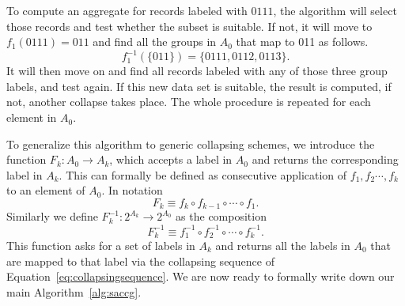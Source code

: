 \documentclass[11pt, fleqn]{article}
\begin{document}
To compute an aggregate for records labeled with $0111$, the algorithm will
select those records and test whether the subset is suitable. If not, it will
move to $f_1(0111)=011$ and find all the groups in $A_0$ that map to 011 as
follows.
\begin{displaymath}
f_1^{-1}(\{011\}) = \{0111, 0112, 0113\}.
\end{displaymath}
It will then move on and find all records labeled with any of those three
group labels, and test again. If this new data set is suitable, the result is
computed, if not, another collapse takes place. The whole procedure is repeated 
for each element in $A_0$.




To generalize this algorithm to generic collapsing schemes, we introduce
the function $F_k:A_0\to A_k$, which accepts a label in $A_0$ and 
returns the corresponding label in $A_k$. This can formally be defined 
as consecutive application of $f_1, f_2\cdots, f_k$ to an element of 
$A_0$. In notation
\begin{equation*}
F_k \equiv f_k\circ f_{k-1}\circ\cdots\circ f_1.
\end{equation*}
Similarly we define $F^{-1}_k:2^{A_k}\to 2^{A_0}$ as the composition
\begin{equation*}
F_k^{-1} \equiv f_1^{-1}\circ f_2^{-1}\circ\cdots\circ f_k^{-1}.
\end{equation*}
This function asks for a set of labels in $A_k$ and returns all the labels in
$A_0$ that are mapped to that label via the collapsing sequence of
Equation~\eqref{eq:collapsingsequence}.  We are now ready to formally
write down our main Algorithm~\ref{alg:saccg}.
\end{document}
